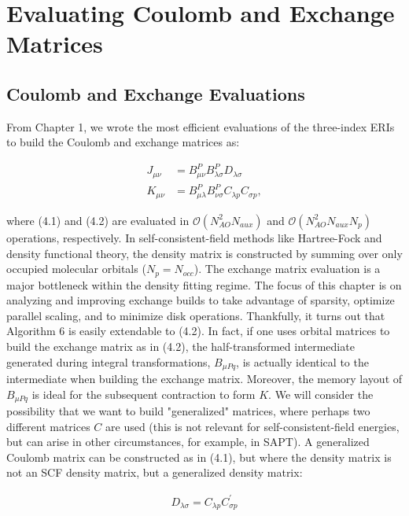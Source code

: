 \chapter{Evaluating Coulomb and Exchange Matrices}

\section{Coulomb and Exchange Evaluations}

From Chapter 1, we wrote the most efficient evaluations of the three-index ERIs to build the Coulomb and exchange matrices as:

\begin{align}
J_{\mu \nu} &= B_{\mu \nu}^P B_{\lambda \sigma}^PD_{\lambda \sigma} \\
K_{\mu \nu} &= B_{\mu \lambda}^P B_{\nu \sigma}^PC_{\lambda p}C_{\sigma p},
\end{align}

\noindent where (4.1) and (4.2) are evaluated in $\mathcal{O}(N_{AO}^2N_{aux})$ and $\mathcal{O}(N_{AO}^2N_{aux}N_p)$ operations, respectively.
In self-consistent-field methods like Hartree-Fock and density functional theory, the density matrix is constructed by summing over only occupied
molecular orbitals ($N_p=N_{occ}$).
The exchange matrix evaluation is a major bottleneck within the density fitting regime. The focus of this chapter is on analyzing and improving
exchange builds to take advantage of sparsity, optimize parallel scaling, and to minimize disk operations.
Thankfully, it turns out that Algorithm 6 is easily 
extendable to (4.2). In fact, if one uses orbital matrices to build the exchange matrix as in (4.2), the half-transformed 
intermediate generated during integral transformations, $B_{\mu Pq}$, is actually identical to the intermediate when building the exchange matrix. 
Moreover, the memory layout of $B_{\mu Pq}$ is ideal for the subsequent contraction to form $K$. We will consider the possibility that we want to build
"generalized" matrices, where perhaps two different matrices $C$ are used (this is not relevant for self-consistent-field energies, but can arise in 
other circumstances, for example, in SAPT). A generalized Coulomb matrix can be constructed as in (4.1), but where the density matrix is not an SCF density 
matrix, but a generalized density matrix: 

\begin{align}
D_{\lambda \sigma}=C_{\lambda p} C^{\prime}_{\sigma p} 
\end{align}

